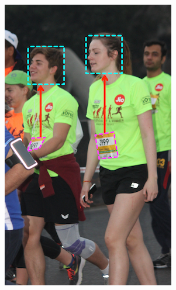 \begin{figure}[p]
  \centering
  \hspace{\fill}
  \begin{subfigure}[b]{0.25\textwidth}
    \includegraphics[width=\textwidth]{images/dataset/FaceBounds_Detection}
  \end{subfigure}
  \hspace{\fill}
  \begin{subfigure}[b]{0.25\textwidth}

\end{subfigure}
\end{figure}
